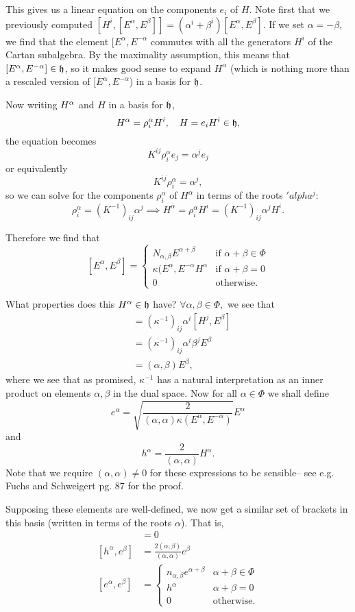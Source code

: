 This gives us a linear equation on the components $e_i$ of $H$. Note first that we previously computed $[H^i,[E^\alpha,E^\beta]]=(\alpha^i+\beta^i)[E^\alpha,E^\beta].$ If we set $\alpha=-\beta,$ we find that the element $[E^\alpha,E^{-\alpha}$ commutes with all the generators $H^i$ of the Cartan subalgebra. By the maximality assumption, this means that $[E^\alpha,E^{-\alpha}]\in \mathfrak{h}$, so it makes good sense to expand $H^\alpha$ (which is nothing more than a rescaled version of $[E^\alpha,E^{-\alpha}$) in a basis for $\mathfrak{h}$.

Now writing $H^\alpha$ and $H$ in a basis for $\mathfrak{h}$,
$$H^\alpha=\rho_i^\alpha H^i, \quad H=e_i H^i \in \mathfrak{h},$$
the equation becomes
$$K^{ij} \rho^{\alpha}_i e_j= \alpha^j e_j$$
or equivalently
$$K^{ij} \rho_i^\alpha= \alpha^j,$$
so we can solve for the components $\rho_i^\alpha$ of $H^\alpha$ in terms of the roots $'alpha^j$:
$$\rho_i^\alpha = (K^{-1})_{ij} \alpha^j \implies H^\alpha = \rho_i^\alpha H^i = (K^{-1})_{ij} \alpha^j H^i.$$

Therefore we find that
$$[E^\alpha,E^\beta]=\begin{cases}
N_{\alpha,\beta}E^{\alpha+\beta} & \text{if }\alpha+\beta\in \Phi\\
\kappa(E^\alpha, E^{-\alpha}H^\alpha & \text {if }\alpha+\beta=0\\
0 & \text{otherwise.}
\end{cases}
$$

What properties does this $H^\alpha \in \mathfrak{h}$ have? $\forall \alpha,\beta \in \Phi,$ we see that
\begin{align*}
    [H^\alpha,E^\beta]&=(\kappa^{-1})_{ij}\alpha^i [H^j,E^\beta]\\
    &=(\kappa^{-1})_{ij}\alpha^i \beta^j E^\beta\\
    &=(\alpha,\beta) E^\beta,
\end{align*}
where we see that as promised, $\kappa^{-1}$ has a natural interpretation as an inner product on elements $\alpha,\beta$ in the dual space. Now for all $\alpha\in \Phi$ we shall define
$$e^\alpha=\sqrt{\frac{2}{(\alpha,\alpha)\kappa(E^\alpha, E^{-\alpha})}}E^\alpha$$
and
$$h^\alpha=\frac{2}{(\alpha,\alpha)}H^{\alpha}.$$
Note that we require $(\alpha,\alpha)\neq 0$ for these expressions to be sensible-- see e.g. Fuchs and Schweigert pg. 87 for the proof.

Supposing these elements are well-defined, we now get a similar set of brackets in this basis (written in terms of the roots $\alpha$). That is,
\begin{align*}
    [h^\alpha, h^\beta]&= 0\\
    [h^\alpha,e^\beta]&= \frac{2(\alpha,\beta)}{(\alpha,\alpha)}e^\beta\\
    [e^\alpha,e^\beta]&=\begin{cases}
    n_{\alpha,\beta} e^{\alpha+\beta} & \alpha+\beta \in \Phi\\
    h^\alpha & \alpha+\beta =0\\
    0 & \text{otherwise}.
    \end{cases}
\end{align*}

